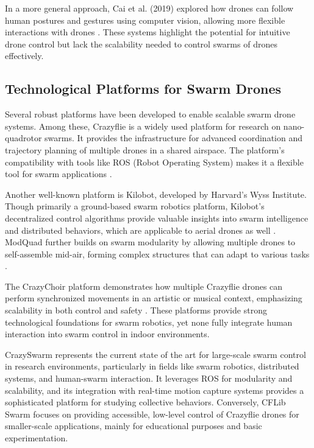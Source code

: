 In a more general approach, Cai et al. (2019) explored how drones can follow human postures and gestures using computer vision, allowing more flexible interactions with drones \cite{cai_human_drone}. These systems highlight the potential for intuitive drone control but lack the scalability needed to control swarms of drones effectively.

\subsection{Technological Platforms for Swarm Drones}

Several robust platforms have been developed to enable scalable swarm drone systems. Among these, Crazyflie is a widely used platform for research on nano-quadrotor swarms. It provides the infrastructure for advanced coordination and trajectory planning of multiple drones in a shared airspace. The platform’s compatibility with tools like \gls{ROS} (Robot Operating System) makes it a flexible tool for swarm applications \cite{crazyflie}.

Another well-known platform is Kilobot, developed by Harvard’s Wyss Institute. Though primarily a ground-based swarm robotics platform, Kilobot’s decentralized control algorithms provide valuable insights into swarm intelligence and distributed behaviors, which are applicable to aerial drones as well \cite{kilobot}. ModQuad further builds on swarm modularity by allowing multiple drones to self-assemble mid-air, forming complex structures that can adapt to various tasks \cite{modquad}.

The CrazyChoir platform demonstrates how multiple Crazyflie drones can perform synchronized movements in an artistic or musical context, emphasizing scalability in both control and safety \cite{crazychoir}. These platforms provide strong technological foundations for swarm robotics, yet none fully integrate human interaction into swarm control in indoor environments.

CrazySwarm \cite{preiss2017crazyswarm} represents the current state of the art for large-scale swarm control in research environments, particularly in fields like swarm robotics, distributed systems, and human-swarm interaction. It leverages \gls{ROS} for modularity and scalability, and its integration with real-time motion capture systems provides a sophisticated platform for studying collective behaviors. Conversely, CFLib Swarm focuses on providing accessible, low-level control of Crazyflie drones for smaller-scale applications, mainly for educational purposes and basic experimentation.

